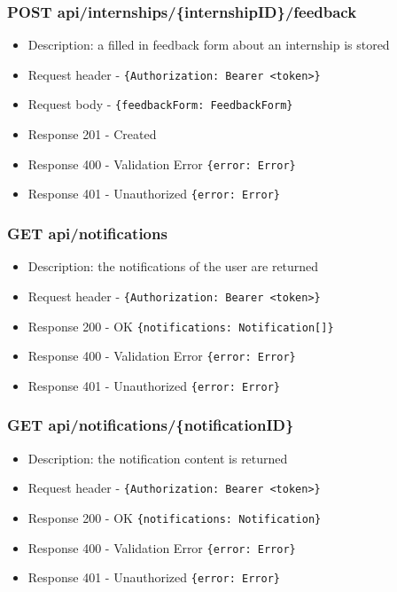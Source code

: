 \subsubsection{POST api/internships/\{internshipID\}/feedback}
\begin{itemize}
    \item Description: a filled in feedback form about an internship is stored
    \item Request header - \verb|{Authorization: Bearer <token>}|
    \item Request body - \verb|{feedbackForm: FeedbackForm}|
    \item Response 201 - Created
    \item Response 400 - Validation Error \verb|{error: Error}|
    \item Response 401 - Unauthorized \verb|{error: Error}|
\end{itemize}

\subsubsection{GET api/notifications}
\begin{itemize}
    \item Description: the notifications of the user are returned
    \item Request header - \verb|{Authorization: Bearer <token>}|
    \item Response 200 - OK \verb|{notifications: Notification[]}|
    \item Response 400 - Validation Error \verb|{error: Error}|
    \item Response 401 - Unauthorized \verb|{error: Error}|
\end{itemize}

\subsubsection{GET api/notifications/\{notificationID\}}
\begin{itemize}
    \item Description: the notification content is returned
    \item Request header - \verb|{Authorization: Bearer <token>}|
    \item Response 200 - OK \verb|{notifications: Notification}|
    \item Response 400 - Validation Error \verb|{error: Error}|
    \item Response 401 - Unauthorized \verb|{error: Error}|
\end{itemize}

